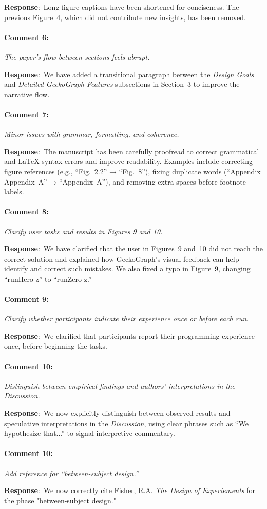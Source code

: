 \documentclass{article}
\newcommand{\pointRaised}[2]{\medskip \noindent 
               \paragraph{#1} \textsl{#2}}
\newcommand{\reply}{\noindent \textbf{Response}:\ }
\begin{document}
\reply Long figure captions have been shortened for conciseness. The previous Figure~4, which did not contribute new insights, has been removed.

\pointRaised{Comment 6:}{The paper’s flow between sections feels abrupt.}

\reply We have added a transitional paragraph between the \textit{Design Goals} and \textit{Detailed GeckoGraph Features} subsections in Section~3 to improve the narrative flow.

\pointRaised{Comment 7:}{Minor issues with grammar, formatting, and coherence.}

\reply The manuscript has been carefully proofread to correct grammatical and LaTeX syntax errors and improve readability.  
Examples include correcting figure references (e.g., “Fig.~2.2” → “Fig.~8”), fixing duplicate words (“Appendix Appendix~A” → “Appendix~A”), and removing extra spaces before footnote labels.

\pointRaised{Comment 8:}{Clarify user tasks and results in Figures 9 and 10.}

\reply We have clarified that the user in Figures~9 and~10 did not reach the correct solution and explained how GeckoGraph’s visual feedback can help identify and correct such mistakes. We also fixed a typo in Figure~9, changing “runHero z” to “runZero z.”

\pointRaised{Comment 9:}{Clarify whether participants indicate their experience once or before each run.}

\reply We clarified that participants report their programming experience once, before beginning the tasks.

\pointRaised{Comment 10:}{Distinguish between empirical findings and authors’ interpretations in the Discussion.}

\reply We now explicitly distinguish between observed results and speculative interpretations in the \textit{Discussion}, using clear phrases such as “We hypothesize that...” to signal interpretive commentary.

\pointRaised{Comment 10:}{Add reference for “between-subject design.”}

\reply We now correctly cite Fisher, R.A. {\it The Design of Experiements} for the phase "between-subject design."
\end{document}
